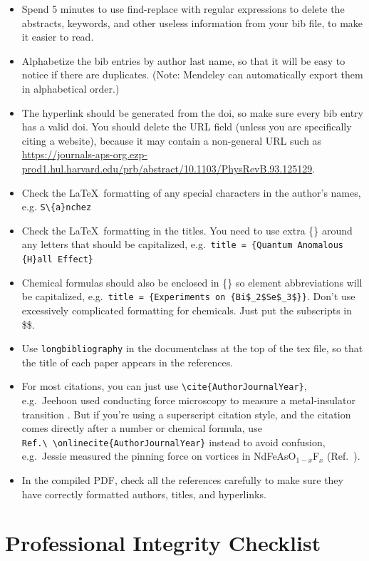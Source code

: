 \documentclass[aps,prb,twocolumn,superscriptaddress,floatfix,longbibliography]{revtex4-2}
\begin{document}
\begin{itemize}[label=$\Box$]
\item Spend 5 minutes to use find-replace with regular expressions to delete the abstracts, keywords, and other useless information from your bib file, to make it easier to read.
\item Alphabetize the bib entries by author last name, so that it will be easy to notice if there are duplicates. (Note: Mendeley can automatically export them in alphabetical order.)
\item The hyperlink should be generated from the doi, so make sure every bib entry has a valid doi. You should delete the URL field (unless you are specifically citing a website), because it may contain a non-general URL such as \url{https://journals-aps-org.ezp-prod1.hul.harvard.edu/prb/abstract/10.1103/PhysRevB.93.125129}.
\item Check the \LaTeX\ formatting of any special characters in the author's names, e.g. {\tt S\textbackslash\textquotesingle\{a\}nchez}
\item Check the \LaTeX\ formatting in the titles. You need to use extra \{\} around any letters that should be capitalized, e.g.\ {\tt title = \{Quantum Anomalous \{H\}all Effect\} }
\item Chemical formulas should also be enclosed in \{\} so element abbreviations will be capitalized, e.g.\ {\tt title = \{Experiments on \{Bi\$\_2\$Se\$\_3\$\}\}}. Don't use excessively complicated formatting for chemicals. Just put the subscripts in \$\$.
\item Use {\tt longbibliography} in the documentclass at the top of the tex file, so that the title of each paper appears in the references.
\item For most citations, you can just use {\tt \textbackslash cite\{AuthorJournalYear\}}, e.g.\ Jeehoon used conducting force microscopy to measure a metal-insulator transition \cite{KimAPL2010}. But if you're using a superscript citation style, and the citation comes directly after a number or chemical formula, use {\tt Ref.\textbackslash\ \textbackslash onlinecite\{AuthorJournalYear\}} instead to avoid confusion, e.g.\ Jessie measured the pinning force on vortices in NdFeAsO$_{1-x}$F$_x$ (Ref.\ ).
\item In the compiled PDF, check all the references carefully to make sure they have correctly formatted authors, titles, and hyperlinks.
\end{itemize}

\section{\label{sec:Integrity}Professional Integrity Checklist}
\end{document}
